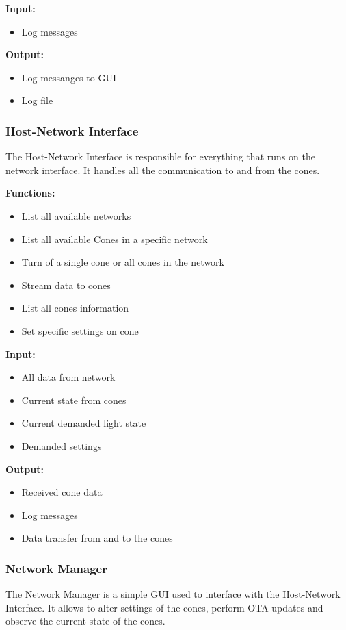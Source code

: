 \textbf{Input:}
\begin{itemize}
	\item Log messages 
\end{itemize}

\textbf{Output:}
\begin{itemize}
	\item Log messanges to \ac{GUI}
	\item Log file
\end{itemize}


\subsubsection{Host-Network Interface}
The Host-Network Interface is responsible for everything that runs on the network interface. It handles all the communication to and from the cones. 

\textbf{Functions:}
\begin{itemize}
	\item List all available networks
	\item List all available Cones in a specific network
	\item Turn of a single cone or all cones in the network
	\item Stream data to cones
	\item List all cones information
	\item Set specific settings on cone
\end{itemize}

\textbf{Input:}

\begin{itemize}
	\item All data from network
	\item Current state from cones
	\item Current demanded light state
	\item Demanded settings
\end{itemize}

\textbf{Output:}
\begin{itemize}
	\item Received cone data
	\item Log messages
	\item Data transfer from and to the cones
\end{itemize}

\subsubsection{Network Manager}
The Network Manager is a simple \ac{GUI} used to interface with the Host-Network Interface. It allows to alter settings of the cones, perform \ac{OTA} updates and observe the current state of the cones. 


